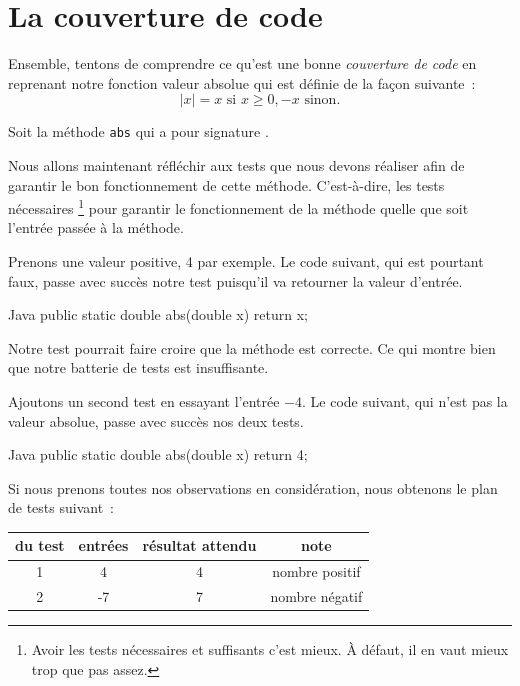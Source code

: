 \documentclass[a4paper,11pt]{style-esi/td}
\begin{document}
\section{La couverture de code}

Ensemble, tentons de comprendre ce qu'est une bonne \emph{couverture de code}
en reprenant notre fonction valeur absolue qui est définie de la façon suivante~:
$$
	|x| = x \textrm{ si } x \geq 0, -x \textrm{ sinon}.
$$

Soit la méthode \texttt{abs} qui a pour signature
.

Nous allons maintenant réfléchir aux tests que nous devons réaliser
afin de garantir le bon fonctionnement de cette méthode.
C'est-à-dire, les tests nécessaires%
\footnote{%
	Avoir les tests nécessaires et suffisants c'est mieux.
	À défaut, il en vaut mieux trop que pas assez.
}
pour garantir le fonctionnement de la méthode
quelle que soit l'entrée passée à la méthode.

Prenons une valeur positive, 4 par exemple.
Le code suivant, qui est pourtant faux,
passe avec succès notre test puisqu'il va retourner la valeur d'entrée.
\begin{Code}{Java}
	public static double abs(double x) {
		return x;
	}
\end{Code}

Notre test pourrait faire croire que la méthode est correcte.
Ce qui montre bien que notre batterie de tests est insuffisante.

Ajoutons un second test en essayant l'entrée $-4$.
Le code suivant, qui n'est pas la valeur absolue, passe avec succès nos deux tests.

\begin{Code}{Java}
	public static double abs(double x) {
		return 4;
	}
\end{Code}

Si nous prenons toutes nos observations en considération,
nous obtenons le plan de tests suivant~:

\begin{center}
	\begin{tabular}{|c|c|c|c|}
		\hline
		\no du test & entrées & résultat attendu & note           \\
		\hline
		1           & 4       & 4                & nombre positif \\
		\hline
		2           & -7      & 7                & nombre négatif \\
		\hline
	\end{tabular}
\end{center}
\end{document}
